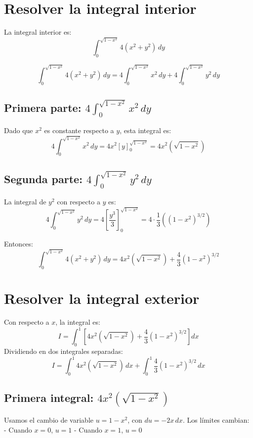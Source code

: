 \section*{Resolver la integral interior}

La integral interior es:
\[
\int_0^{\sqrt{1-x^2}} 4(x^2 + y^2) \, dy
\]

\[
\int_0^{\sqrt{1-x^2}} 4(x^2 + y^2) \, dy = 4 \int_0^{\sqrt{1-x^2}} x^2 \, dy + 4 \int_0^{\sqrt{1-x^2}} y^2 \, dy
\]

\subsection*{Primera parte: \( 4 \int_0^{\sqrt{1-x^2}} x^2 \, dy \)}

Dado que \(x^2\) es constante respecto a \(y\), esta integral es:
\[
4 \int_0^{\sqrt{1-x^2}} x^2 \, dy = 4 x^2 \left[ y \right]_0^{\sqrt{1-x^2}} = 4 x^2 (\sqrt{1 - x^2})
\]

\subsection*{Segunda parte: \( 4 \int_0^{\sqrt{1-x^2}} y^2 \, dy \)}

La integral de \(y^2\) con respecto a \(y\) es:
\[
4 \int_0^{\sqrt{1-x^2}} y^2 \, dy = 4 \left[ \frac{y^3}{3} \right]_0^{\sqrt{1-x^2}} = 4 \cdot \frac{1}{3} \left( (1 - x^2)^{3/2} \right)
\]

Entonces:
\[
\int_0^{\sqrt{1-x^2}} 4(x^2 + y^2) \, dy = 4 x^2 (\sqrt{1 - x^2}) + \frac{4}{3} (1 - x^2)^{3/2}
\]

\section*{Resolver la integral exterior}

Con respecto a \(x\), la integral es:
\[
I = \int_0^1 \left[ 4 x^2 (\sqrt{1 - x^2}) + \frac{4}{3} (1 - x^2)^{3/2} \right] dx
\]
Dividiendo en dos integrales separadas:
\[
I = \int_0^1 4 x^2 (\sqrt{1 - x^2}) \, dx + \int_0^1 \frac{4}{3} (1 - x^2)^{3/2} \, dx
\]

\subsection*{Primera integral: \( 4 x^2 (\sqrt{1 - x^2}) \)}

Usamos el cambio de variable \( u = 1 - x^2 \), con \( du = -2x \, dx \). Los límites cambian:
- Cuando \( x = 0 \), \( u = 1 \)
- Cuando \( x = 1 \), \( u = 0 \)

